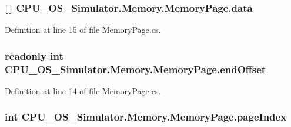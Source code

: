 \subsubsection[{data}]{ \mbox{[}$\,$\mbox{]} C\+P\+U\+\_\+\+O\+S\+\_\+\+Simulator.\+Memory.\+Memory\+Page.\+data\hspace{0.3cm}{\ttfamily [private]}}\label{class_c_p_u___o_s___simulator_1_1_memory_1_1_memory_page_af9ab25101e7920de2344e0fa5ddfaa27}


Definition at line 15 of file Memory\+Page.\+cs.

\hypertarget{class_c_p_u___o_s___simulator_1_1_memory_1_1_memory_page_ae2f8f419909326ce5449d37af9ff7c89}{}
\subsubsection[{end\+Offset}]{\setlength{\rightskip}{0pt plus 5cm}readonly int C\+P\+U\+\_\+\+O\+S\+\_\+\+Simulator.\+Memory.\+Memory\+Page.\+end\+Offset\hspace{0.3cm}{\ttfamily [private]}}\label{class_c_p_u___o_s___simulator_1_1_memory_1_1_memory_page_ae2f8f419909326ce5449d37af9ff7c89}


Definition at line 14 of file Memory\+Page.\+cs.

\hypertarget{class_c_p_u___o_s___simulator_1_1_memory_1_1_memory_page_acf60a7bdefab6120fe080854b5f0b38b}{}
\subsubsection[{page\+Index}]{\setlength{\rightskip}{0pt plus 5cm}int C\+P\+U\+\_\+\+O\+S\+\_\+\+Simulator.\+Memory.\+Memory\+Page.\+page\+Index\hspace{0.3cm}{\ttfamily [private]}}\label{class_c_p_u___o_s___simulator_1_1_memory_1_1_memory_page_acf60a7bdefab6120fe080854b5f0b38b}


